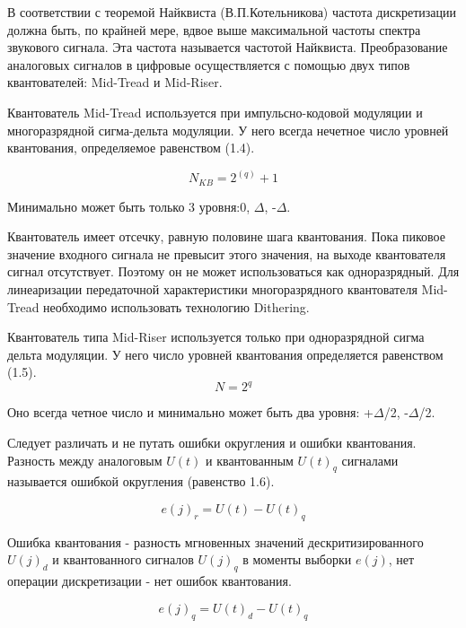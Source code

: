 \documentclass[12pt,a4paper,oneside]{report}
\begin{document}
В соответствии с теоремой Найквиста (В.П.Котельникова) частота дискретизации должна быть, по крайней мере, вдвое выше максимальной частоты спектра звукового сигнала. Эта частота называется частотой Найквиста. Преобразование аналоговых сигналов в цифровые осуществляется с помощью двух типов квантователей: Mid-Tread и Mid-Riser.

Квантователь Mid-Tread используется при импульсно-кодовой модуляции и многоразрядной сигма-дельта модуляции. У него всегда нечетное число уровней квантования, определяемое равенством (1.4).

\begin{equation}
	N_{KB} = 2^{(q)} + 1
	\label{eq:ref}
\end{equation}

Минимально может быть только 3 уровня:0, $\Delta$, -$\Delta$.

Квантователь имеет отсечку, равную половине шага квантования. Пока пиковое значение входного сигнала не превысит этого значения, на выходе квантователя сигнал отсутствует. Поэтому он не может использоваться как одноразрядный. Для линеаризации передаточной характеристики многоразрядного квантователя Mid-Tread необходимо использовать технологию Dithering.

Квантователь типа Mid-Riser используется только при одноразрядной сигма дельта модуляции. У него число уровней квантования определяется равенством (1.5).
\begin{equation}
	N = 2^q
	\label{eq:ref}
\end{equation}

Оно всегда четное число и минимально может быть два уровня: +$\Delta$/2, -$\Delta$/2.

Следует различать и не путать ошибки округления и ошибки квантования. Разность между аналоговым $U(t)$ и квантованным $U(t)_q$ сигналами называется ошибкой округления (равенство 1.6).

\begin{equation}
	e(j)_r = U(t) - U(t)_q
	\label{eq:ref}
\end{equation}

Ошибка квантования - разность мгновенных значений дескритизированного $U(j)_d $ и квантованного сигналов $U(j)_q$ в моменты выборки $e(j)$, нет операции дискретизации - нет ошибок квантования.

\begin{equation}
	e(j)_q = U(t)_d - U(t)_q
	\label{eq:ref}
\end{equation}
\end{document}
